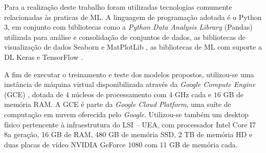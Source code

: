 
Para a realização deste trabalho foram utilizadas tecnologias comumente relacionadas às praticas de ML. A linguagem de programação adotada é o Python 3, em conjunto com bibliotecas como a \emph{Python Data Analysis Library} (Pandas) \cite{pandas} utilizada para análise e consolidação de conjuntos de dados, as bibliotecas de visualização de dados Seaborn \cite{seaborn} e MatPlotLib \cite{matplotlib}, as bibliotecas de ML com suporte a DL Keras \cite{keras} e TensorFlow \cite{tensorflow}.

A fim de executar o treinamento e teste dos modelos propostos, utilizou-se uma instância de máquina virtual disponibilizada através da \emph{Google Compute Engine} (GCE) \cite{gce}, dotada de $4$ núcleos de processamento com $4$ GHz cada e $16$ GB de memória RAM. A GCE é parte da \emph{Google Cloud Platform}, uma suíte de computação em nuvem oferecida pelo \emph{Google}. Utilizou-se também um desktop físico pertencente à infraestrutura do LSI -- UEA, com processador Intel Core I7 8a geração, 16 GB de RAM, 480 GB de memória SSD, 2 TB de memória HD e duas placas de vídeo NVIDIA GeForce 1080 com 11 GB de memória cada.
